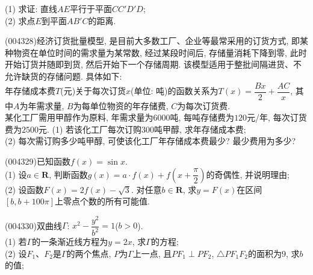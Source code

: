 \begin{center}
\end{center}
(1) 求证: 直线$AE$平行于平面$CC'D'D$;\\
(2) 求点$E$到平面$AB'C$的距离.
\item (004328)经济订货批量模型, 是目前大多数工厂、企业等最常采用的订货方式, 即某种物资在单位时间的需求量为某常数, 经过某段时间后, 存储量消耗下降到零, 此时开始订货并随即到货, 然后开始下一个存储周期. 该模型适用于整批间隔进货、不允许缺货的存储问题. 具体如下:\\
年存储成本费$T$(元)关于每次订货$x$(单位: 吨)的函数关系为$T(x)=\dfrac{Bx}2+\dfrac{AC}x$, 其中$A$为年需求量, $B$为每单位物资的年存储费, $C$为每次订货费.\\
某化工厂需用甲醇作为原料, 年需求量为$6000$吨, 每吨存储费为$120$元/年, 每次订货费为$2500$元.
(1) 若该化工厂每次订购$300$吨甲醇, 求年存储成本费;\\
(2) 每次需订购多少吨甲醇, 可使该化工厂年存储成本费最少? 最少费用为多少?
\item (004329)已知函数$f(x)=\sin x$.\\
(1) 设$a\in \mathbf{R}$, 判断函数$g(x)=a\cdot f(x)+f(x+\dfrac{\pi}2)$的奇偶性, 并说明理由;\\
(2) 设函数$F(x)=2f(x)-\sqrt 3$. 对任意$b\in \mathbf{R}$, 求$y=F(x)$在区间$[b,b+100\pi]$上零点个数的所有可能值.
\item (004330)双曲线$\Gamma$: $x^2-\dfrac{y^2}{b^2}=1$($b>0$).\\
(1) 若$\Gamma$的一条渐近线方程为$y=2x$, 求$\Gamma$的方程;\\
(2) 设$F_1$、$F_2$是$\Gamma$的两个焦点, $P$为$\Gamma$上一点, 且$PF_1\perp PF_2$, $\triangle PF_1F_2$的面积为$9$, 求$b$的值;\\
